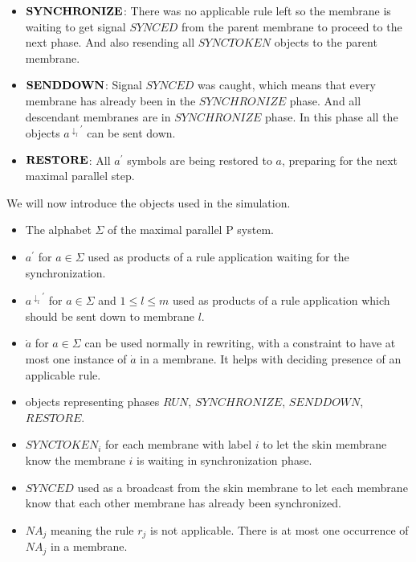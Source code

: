 \begin{dokaz}
\begin{itemize}
    \item $\mathit{\bf SYNCHRONIZE}$: There was no applicable rule left so the membrane is waiting to get signal $\mathit{SYNCED}$ from the parent membrane to proceed to the next phase. And also resending all $\mathit{SYNCTOKEN}$ objects to the parent membrane.

    \item $\mathit{\bf SENDDOWN}$: Signal $\mathit{SYNCED}$ was caught, which means that every membrane has already been in the $\mathit{SYNCHRONIZE}$ phase. And all descendant membranes are in $\mathit{SYNCHRONIZE}$ phase. In this phase all the objects $a^{\downarrow_l\prime}$ can be sent down.

    \item $\mathit{\bf RESTORE}$: All $a^{\prime}$ symbols are being restored to $a$, preparing for the next maximal parallel step.
  \end{itemize}


  We will now introduce the objects used in the simulation.
  
  \begin{itemize}
    \item The alphabet $\Sigma$ of the maximal parallel P system.
    \item $a^\prime$ for $a\in\Sigma$ used as products of a rule application waiting for the synchronization.
    \item $a^{\downarrow_l\prime}$ for $a\in\Sigma$ and $1\leq l\leq m$ used as products of a rule application which should be sent down to membrane $l$. 
    \item $\dot{a}$ for $a\in\Sigma$ can be used normally in rewriting, with a constraint to have at most one instance of $\dot{a}$ in a membrane. It helps with deciding presence of an applicable rule. 
    \item objects representing phases $\mathit{RUN}$, $\mathit{SYNCHRONIZE}$, $\mathit{SENDDOWN}$, $\mathit{RESTORE}$.
    \item $SYNCTOKEN_i$ for each membrane with label $i$ to let the skin membrane know the membrane $i$ is waiting in synchronization phase.
    \item $SYNCED$ used as a broadcast from the skin membrane to let each membrane know that each other membrane has already been synchronized.
    \item $NA_j$ meaning the rule $r_j$ is not applicable. There is at most one occurrence of $NA_j$ in a membrane.
  \end{itemize}


\end{dokaz}
